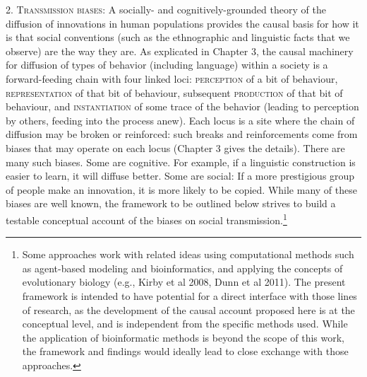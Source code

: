 2. \textsc{Transmission biases}: A socially- and cognitively-grounded theory of the diffusion of innovations in human populations provides the causal basis for how it is that social conventions (such as the ethnographic and linguistic facts that we observe) are the way they are. As explicated in Chapter 3, the causal machinery for diffusion of types of behavior (including language) within a society is a forward-feeding chain with four linked loci: \textsc{perception} of a bit of behaviour, \textsc{representation} of that bit of behaviour, subsequent \textsc{production} of that bit of behaviour, and \textsc{instantiation} of some trace of the behavior (leading to perception by others, feeding into the process anew). Each locus is a site where the chain of diffusion may be broken or reinforced: such breaks and reinforcements come from biases that may operate on each locus (Chapter 3 gives the details). There are many such biases. Some are cognitive. For example, if a linguistic construction is easier to learn, it will diffuse better. Some are social: If a more prestigious group of people make an innovation, it is more likely to be copied. While many of these biases are well known, the framework to be outlined below strives to build a testable conceptual account of the biases on social transmission.\footnote{Some approaches work with related ideas using computational methods such as agent-based modeling and bioinformatics, and applying the concepts of evolutionary biology (e.g., Kirby et al 2008, Dunn et al 2011). The present framework is intended to have potential for a direct interface with those lines of research, as the development of the causal account proposed here is at the conceptual level, and is independent from the specific methods used. While the application of bioinformatic methods is beyond the scope of this work, the framework and findings would ideally lead to close exchange with those approaches.}

